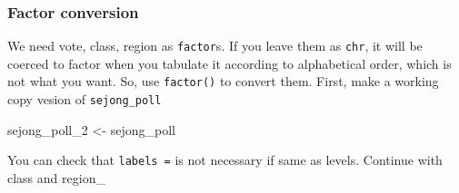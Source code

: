 \documentclass[
]{article}
\newenvironment{Shaded}{\begin{snugshade}}{\end{snugshade}}
\newcommand{\DataTypeTok}[1]{\textcolor[rgb]{0.13,0.29,0.53}{#1}}
\newcommand{\DecValTok}[1]{\textcolor[rgb]{0.00,0.00,0.81}{#1}}
\newcommand{\KeywordTok}[1]{\textcolor[rgb]{0.13,0.29,0.53}{\textbf{#1}}}
\newcommand{\NormalTok}[1]{#1}
\newcommand{\OperatorTok}[1]{\textcolor[rgb]{0.81,0.36,0.00}{\textbf{#1}}}
\newcommand{\StringTok}[1]{\textcolor[rgb]{0.31,0.60,0.02}{#1}}
\begin{document}
\hypertarget{factor-conversion}{%
\subsubsection{Factor conversion}\label{factor-conversion}}

We need vote, class, region as \texttt{factor}s. If you leave them as
\texttt{chr}, it will be coerced to factor when you tabulate it
according to alphabetical order, which is not what you want. So, use
\texttt{factor()} to convert them. First, make a working copy vesion of
\texttt{sejong\_poll}

\begin{Shaded}
\begin{Highlighting}[]
\NormalTok{sejong\_poll\_}\DecValTok{2}\NormalTok{ \textless{}{-}}\StringTok{ }\NormalTok{sejong\_poll}
\end{Highlighting}
\end{Shaded}

\begin{Shaded}
\end{Shaded}

You can check that \texttt{labels\ =} is not necessary if same as
levels. Continue with class and region\_

\begin{Shaded}
\end{Shaded}
\end{document}
